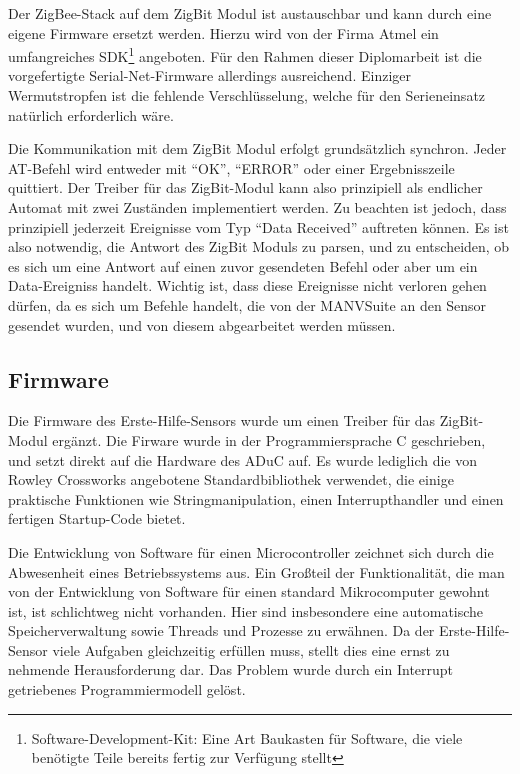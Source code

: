 Der ZigBee-Stack auf dem ZigBit Modul ist austauschbar und kann durch eine eigene Firmware ersetzt werden.
Hierzu wird von der Firma Atmel ein umfangreiches SDK\footnote{Software-Development-Kit: Eine Art Baukasten für
Software, die viele benötigte Teile bereits fertig zur Verfügung stellt} angeboten. Für den Rahmen dieser Diplomarbeit
ist die vorgefertigte Serial-Net-Firmware allerdings ausreichend. Einziger Wermutstropfen ist die fehlende
Verschlüsselung, welche für den Serieneinsatz natürlich erforderlich wäre.

Die Kommunikation mit dem ZigBit Modul erfolgt grundsätzlich synchron. Jeder AT-Befehl wird entweder mit 
"`OK"', "`ERROR"' oder einer Ergebnisszeile quittiert. Der Treiber für das ZigBit-Modul kann also prinzipiell
als endlicher Automat mit zwei Zuständen implementiert werden. Zu beachten ist jedoch, dass prinzipiell
jederzeit Ereignisse vom Typ "`Data Received"' auftreten können. Es ist also notwendig, die Antwort des 
ZigBit Moduls zu parsen, und zu entscheiden, ob es sich um eine Antwort auf einen zuvor gesendeten Befehl
oder aber um ein Data-Ereigniss handelt. Wichtig ist, dass diese Ereignisse nicht verloren gehen dürfen,
da es sich um Befehle handelt, die von der MANVSuite an den Sensor gesendet wurden, und von diesem 
abgearbeitet werden müssen. 


\subsection{Firmware}
Die Firmware des Erste-Hilfe-Sensors wurde um einen Treiber für das ZigBit-Modul ergänzt. Die Firware wurde in der
Programmiersprache C geschrieben, und setzt direkt auf die Hardware des ADuC auf. Es wurde lediglich die von 
Rowley Crossworks angebotene Standardbibliothek verwendet, die einige praktische Funktionen wie Stringmanipulation,
einen Interrupthandler und einen fertigen Startup-Code bietet.

Die Entwicklung von Software für einen Microcontroller zeichnet sich durch die Abwesenheit eines Betriebssystems 
aus. Ein Großteil der Funktionalität, die man von der Entwicklung von Software für einen standard Mikrocomputer 
gewohnt ist, ist schlichtweg nicht vorhanden. Hier sind insbesondere eine automatische Speicherverwaltung sowie
Threads und Prozesse zu erwähnen. Da der Erste-Hilfe-Sensor viele Aufgaben gleichzeitig erfüllen muss, stellt 
dies eine ernst zu nehmende Herausforderung dar. Das Problem wurde durch ein Interrupt getriebenes Programmiermodell
gelöst.

